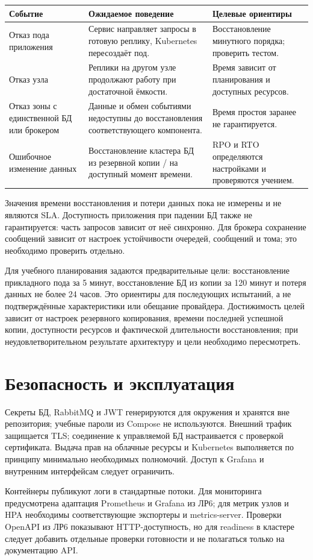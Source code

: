 \documentclass[14pt,a4paper]{extarticle}
\begin{document}
\begin{longtable}{p{3.0cm}p{6.9cm}p{4.4cm}}
\toprule Событие & Ожидаемое поведение & Целевые ориентиры \\ \midrule
Отказ пода приложения & Сервис направляет запросы в готовую реплику, Kubernetes пересоздаёт под. & Восстановление минутного порядка; проверить тестом. \\
Отказ узла & Реплики на другом узле продолжают работу при достаточной ёмкости. & Время зависит от планирования и доступных ресурсов. \\
Отказ зоны с единственной БД или брокером & Данные и обмен событиями недоступны до восстановления соответствующего компонента. & Время простоя заранее не гарантируется. \\
Ошибочное изменение данных & Восстановление кластера БД из резервной копии / на доступный момент времени. & RPO и RTO определяются настройками и проверяются учением. \\
\bottomrule
\end{longtable}
Значения времени восстановления и потери данных пока не измерены и не являются SLA. Доступность приложения при падении БД также не гарантируется: часть запросов зависит от неё синхронно. Для брокера сохранение сообщений зависит от настроек устойчивости очередей, сообщений и тома; это необходимо проверить отдельно.

Для учебного планирования задаются предварительные цели: восстановление прикладного пода за 5 минут, восстановление БД из копии за 120 минут и потеря данных не более 24 часов. Это ориентиры для последующих испытаний, а не подтверждённые характеристики или обещание провайдера. Достижимость целей зависит от настроек резервного копирования, времени последней успешной копии, доступности ресурсов и фактической длительности восстановления; при неудовлетворительном результате архитектуру и цели необходимо пересмотреть.
\section{Безопасность и эксплуатация}
Секреты БД, RabbitMQ и JWT генерируются для окружения и хранятся вне репозитория; учебные пароли из Compose не используются. Внешний трафик защищается TLS; соединение к управляемой БД настраивается с проверкой сертификата. Выдача прав на облачные ресурсы и Kubernetes выполняется по принципу минимально необходимых полномочий. Доступ к Grafana и внутренним интерфейсам следует ограничить.

Контейнеры публикуют логи в стандартные потоки. Для мониторинга предусмотрена адаптация Prometheus и Grafana из ЛР6; для метрик узлов и HPA необходимы соответствующие экспортеры и metrics-server. Проверки OpenAPI из ЛР6 показывают HTTP-доступность, но для readiness в кластере следует добавить отдельные проверки готовности и не полагаться только на документацию API.
\end{document}
